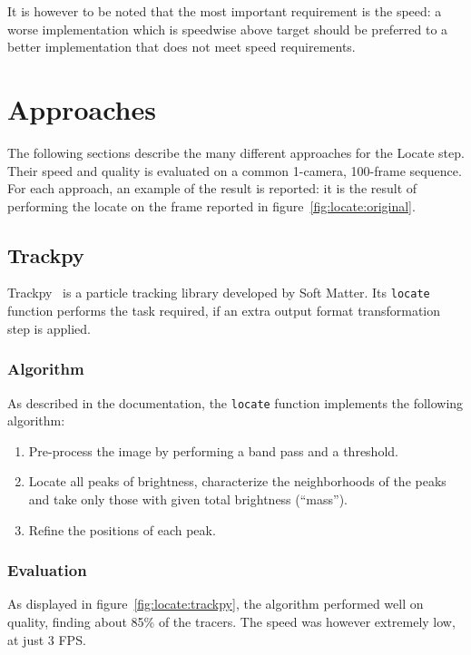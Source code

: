 It is however to be noted that the most important requirement is the speed: a worse implementation which is speedwise above target should be preferred to a better implementation that does not meet speed requirements.

\section{Approaches}

The following sections describe the many different approaches for the Locate step.
Their speed and quality is evaluated on a common 1-camera, 100-frame sequence.
For each approach, an example of the result is reported: it is the result of performing the locate on the frame reported in figure~\ref{fig:locate:original}.

\subsection{Trackpy}

Trackpy~\cite{trackpy} is a particle tracking library developed by Soft Matter.
Its \texttt{locate} function performs the task required, if an extra output format transformation step is applied.

\subsubsection{Algorithm}

As described in the documentation, the \texttt{locate} function implements the following algorithm:
\begin{enumerate}
	\itemsep 0em
	\item Pre-process the image by performing a band pass and a threshold.
	\item Locate all peaks of brightness, characterize the neighborhoods of the peaks and take only those with given total brightness (``mass'').
	\item Refine the positions of each peak.
\end{enumerate}

\subsubsection{Evaluation}

As displayed in figure~\ref{fig:locate:trackpy}, the algorithm performed well on quality, finding about 85\% of the tracers.
The speed was however extremely low, at just 3 FPS.

